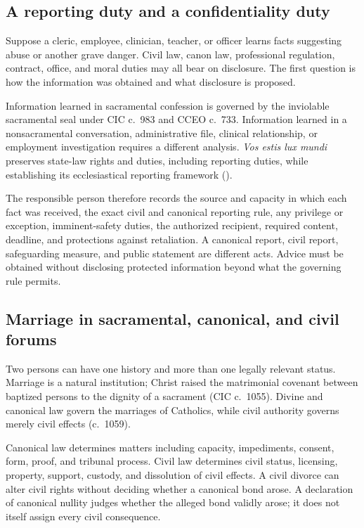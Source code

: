 \subsection{A reporting duty and a confidentiality duty}

Suppose a cleric, employee, clinician, teacher, or officer learns facts suggesting abuse or another grave danger. Civil law, canon law, professional regulation, contract, office, and moral duties may all bear on disclosure. The first question is how the information was obtained and what disclosure is proposed.

Information learned in sacramental confession is governed by the inviolable sacramental seal under CIC c.~983 and CCEO c.~733. Information learned in a nonsacramental conversation, administrative file, clinical relationship, or employment investigation requires a different analysis. \emph{Vos estis lux mundi} preserves state-law rights and duties, including reporting duties, while establishing its ecclesiastical reporting framework ().

The responsible person therefore records the source and capacity in which each fact was received, the exact civil and canonical reporting rule, any privilege or exception, imminent-safety duties, the authorized recipient, required content, deadline, and protections against retaliation. A canonical report, civil report, safeguarding measure, and public statement are different acts. Advice must be obtained without disclosing protected information beyond what the governing rule permits.

\subsection{Marriage in sacramental, canonical, and civil forums}

Two persons can have one history and more than one legally relevant status. Marriage is a natural institution; Christ raised the matrimonial covenant between baptized persons to the dignity of a sacrament (CIC c.~1055). Divine and canonical law govern the marriages of Catholics, while civil authority governs merely civil effects (c.~1059).

Canonical law determines matters including capacity, impediments, consent, form, proof, and tribunal process. Civil law determines civil status, licensing, property, support, custody, and dissolution of civil effects. A civil divorce can alter civil rights without deciding whether a canonical bond arose. A declaration of canonical nullity judges whether the alleged bond validly arose; it does not itself assign every civil consequence.

